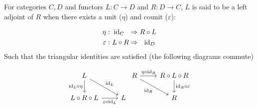\begin{definition}\label{def:adjoint_unit_counit}
  For categories $C,D$ and functors $L: C\to D$ and $R: D\to C$, $L$ is said to
  be a left adjoint of $R$ when there exists a unit ($\eta$) and counit
  ($\varepsilon$): \parencite{leinster:basic_category_theory}

  \[
    \begin{aligned}
      \eta&:\\
      \varepsilon&:
    \end{aligned}
    \ \begin{aligned}
      \mathrm{id}_C\ \ &\Rightarrow R \circ L\\
      L \circ R &\Rightarrow\ \ \mathrm{id}_D
    \end{aligned}
  \]
  Such that the triangular identities are satisfied (the following diagrams
  commute)

  \[\begin{tikzcd} L \\
    {L\circ R\circ L} & L
    \arrow["{\id_L\circ\eta}"', from=1-1, to=2-1]
    \arrow["{\varepsilon\circ \id_L}"', from=2-1, to=2-2]
    \arrow["{\id_L}", from=1-1, to=2-2]
  \end{tikzcd}
  \begin{tikzcd}
    R & {R\circ L\circ R} \\
    & R
    \arrow["{\eta\circ\id_R}", from=1-1, to=1-2]
    \arrow["{\id_R \circ \varepsilon}", from=1-2, to=2-2]
    \arrow["{\id_R}"', from=1-1, to=2-2]
  \end{tikzcd}\]
\end{definition}

